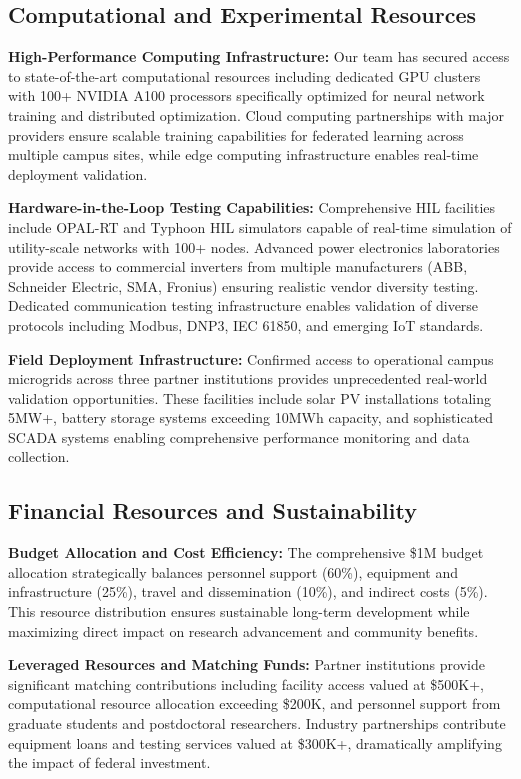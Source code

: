 \documentclass[12pt]{article}
\begin{document}
\subsection{Computational and Experimental Resources}

\textbf{High-Performance Computing Infrastructure:} Our team has secured access to state-of-the-art computational resources including dedicated GPU clusters with 100+ NVIDIA A100 processors specifically optimized for neural network training and distributed optimization. Cloud computing partnerships with major providers ensure scalable training capabilities for federated learning across multiple campus sites, while edge computing infrastructure enables real-time deployment validation.

\textbf{Hardware-in-the-Loop Testing Capabilities:} Comprehensive HIL facilities include OPAL-RT and Typhoon HIL simulators capable of real-time simulation of utility-scale networks with 100+ nodes. Advanced power electronics laboratories provide access to commercial inverters from multiple manufacturers (ABB, Schneider Electric, SMA, Fronius) ensuring realistic vendor diversity testing. Dedicated communication testing infrastructure enables validation of diverse protocols including Modbus, DNP3, IEC 61850, and emerging IoT standards.

\textbf{Field Deployment Infrastructure:} Confirmed access to operational campus microgrids across three partner institutions provides unprecedented real-world validation opportunities. These facilities include solar PV installations totaling 5MW+, battery storage systems exceeding 10MWh capacity, and sophisticated SCADA systems enabling comprehensive performance monitoring and data collection.

\subsection{Financial Resources and Sustainability}

\textbf{Budget Allocation and Cost Efficiency:} The comprehensive \$1M budget allocation \cite{nrel2021} strategically balances personnel support (60\%), equipment and infrastructure (25\%), travel and dissemination (10\%), and indirect costs (5\%). This resource distribution ensures sustainable long-term development while maximizing direct impact on research advancement and community benefits.

\textbf{Leveraged Resources and Matching Funds:} Partner institutions provide significant matching contributions including facility access valued at \$500K+, computational resource allocation exceeding \$200K, and personnel support from graduate students and postdoctoral researchers. Industry partnerships contribute equipment loans and testing services valued at \$300K+, dramatically amplifying the impact of federal investment.
\end{document}
